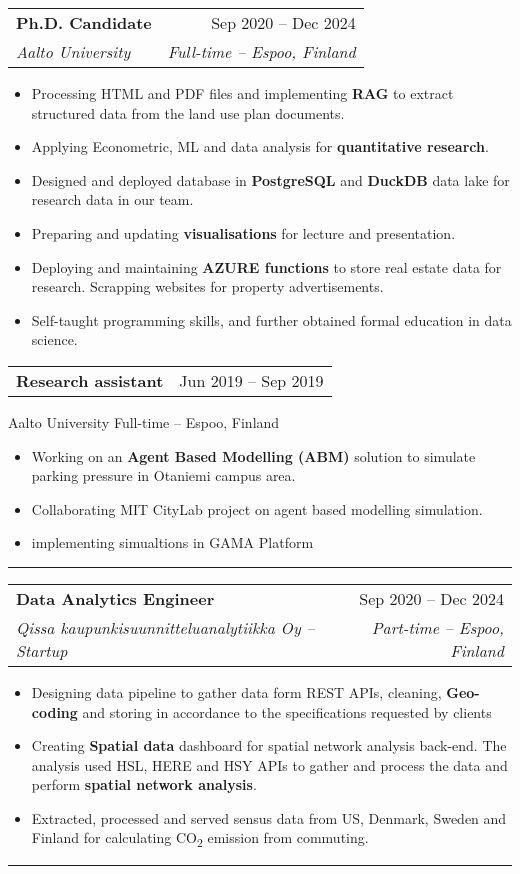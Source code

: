 \documentclass[a4paper,11pt]{article}
\makeatletter
\newcommand{\resumeItem}[1]{
	\item\small{#1}
}
\newcommand{\resumeItemListStart}{\begin{itemize}[rightmargin=0.11in]}
\newcommand{\resumeItemListEnd}{\end{itemize}}
\newcommand{\resumeQuadHeading}[4]{
	\item
	\begin{tabular*}{0.96\textwidth}[t]{l@{\extracolsep{\fill}}r}
		\textbf{#1} & #2 \\
		\textit{\small#3} & \textit{\small #4} \\
	\end{tabular*}
}
\newcommand{\resumeQuadHeadingChild}[2]{
	\item
	\begin{tabular*}{0.96\textwidth}[t]{l@{\extracolsep{\fill}}r}
		\textbf{\small#1} & {\small#2} \\
	\end{tabular*}
}
\makeatother
\begin{document}
	\resumeQuadHeading{Ph.D. Candidate}{Sep 2020 -- Dec 2024}
	{Aalto University}  {Full-time -- Espoo, Finland}
	\resumeItemListStart{}
	\resumeItem{Processing HTML and PDF files and implementing \textbf{RAG} to extract structured data from the land use plan documents.}
	\resumeItem{Applying Econometric, ML and data analysis for \textbf{quantitative research}.}
	\resumeItem{Designed and deployed database in \textbf{PostgreSQL} and \textbf{DuckDB} data lake for research data in our team.}
	\resumeItem{Preparing and updating \textbf{visualisations} for lecture and presentation.}
	\resumeItem{Deploying and maintaining \textbf{AZURE functions} to store real estate data for research. Scrapping websites for property advertisements.}
	\resumeItem{Self-taught programming skills, and further obtained formal education in data science.}
	\resumeItemListEnd{}
	
	\resumeQuadHeadingChild{Research assistant} {Jun 2019 -- Sep 2019}
	{Aalto University}  {Full-time -- Espoo, Finland}
	\resumeItemListStart{}
	\resumeItem{Working on an \textbf{Agent Based Modelling (ABM)} solution to simulate parking pressure in Otaniemi campus area.}
	\resumeItem{Collaborating MIT CityLab project on agent based modelling simulation.}
	\resumeItem{implementing simualtions in GAMA Platform}
	\resumeItemListEnd{}
	\noindent\rule{0.5\linewidth}{0.4pt}


	\resumeQuadHeading{Data Analytics Engineer}{Sep 2020 -- Dec 2024}
	{Qissa kaupunkisuunnitteluanalytiikka Oy -- Startup}  {Part-time -- Espoo, Finland}
	\resumeItemListStart{}
	\resumeItem{Designing data pipeline to gather data form REST APIs, cleaning, \textbf{Geo-coding} and storing in accordance to the specifications requested by clients}
	\resumeItem{Creating \textbf{Spatial data} dashboard for spatial network analysis back-end. The analysis used HSL, HERE and HSY APIs to gather and process the data and perform \textbf{spatial network analysis}.}
	\resumeItem{Extracted, processed and served sensus data from US, Denmark, Sweden and Finland for calculating CO\textsubscript{2} emission from commuting.}
	\resumeItemListEnd{}
	\noindent\rule{0.5\linewidth}{0.4pt}
	
\end{document}
